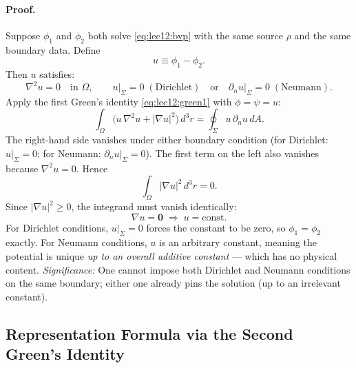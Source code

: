 \paragraph{Proof.}
Suppose $\phi_1$ and $\phi_2$ both solve \eqref{eq:lec12:bvp} with the same source $\rho$
and the same boundary data.  Define
\begin{equation}\label{eq:lec12:u-def}
  u \equiv \phi_1 - \phi_2 .
\end{equation}
Then $u$ satisfies:
\begin{equation}\label{eq:lec12:u-laplace}
  \nabla^2 u = 0 \quad\text{in }\Omega ,
  \qquad
  u\big|_\Sigma = 0 \;(\text{Dirichlet})
  \quad\text{or}\quad
  \partial_n u\big|_\Sigma = 0 \;(\text{Neumann}).
\end{equation}
Apply the first Green's identity \eqref{eq:lec12:green1} with $\phi = \psi = u$:
\begin{equation}\label{eq:lec12:uniqueness-identity}
  \int_\Omega \!\!\bigl(u\,\nabla^2 u + |\nabla u|^2\bigr)\,d^3r
  =
  \oint_\Sigma u\,\partial_n u\,dA .
\end{equation}
The right-hand side vanishes under either boundary condition
(for Dirichlet: $u|_\Sigma = 0$; for Neumann: $\partial_n u|_\Sigma = 0$).
The first term on the left also vanishes because $\nabla^2 u = 0$.  Hence
\begin{equation}\label{eq:lec12:grad-u-zero}
  \int_\Omega |\nabla u|^2\,d^3r = 0 .
\end{equation}
Since $|\nabla u|^2 \geq 0$, the integrand must vanish identically:
\begin{equation}\label{eq:lec12:uniqueness-result}
  \boxed{
    \nabla u = \mathbf{0}
    \;\Longrightarrow\;
    u = \text{const.}
  }
\end{equation}
For Dirichlet conditions, $u|_\Sigma = 0$ forces the constant to be zero, so
$\phi_1 = \phi_2$ exactly.  For Neumann conditions, $u$ is an arbitrary constant,
meaning the potential is unique \emph{up to an overall additive constant} — which
has no physical content.
\textit{Significance:} One cannot impose both Dirichlet and Neumann conditions on
the same boundary; either one already pins the solution (up to an irrelevant constant).

\subsection{Representation Formula via the Second Green's Identity}\label{subsec:lec12-representation}

